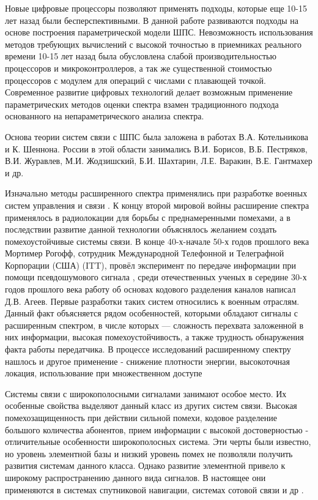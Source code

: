 Новые цифровые процессоры позволяют применять подходы, которые еще 10-15 лет назад были бесперспективными.
В данной работе развиваются подходы на основе построения параметрической модели ШПС. Невозможность использования
методов требующих вычислений с высокой точностью в приемниках реального времени
10-15 лет назад была обусловлена слабой производительностью процессоров и микроконтроллеров, а так же существенной
стоимостью процессоров с модулем для операций с числами с плавающей точкой. Современное развитие цифровых технологий делает 
возможным применение параметрических методов оценки спектра взамен традиционного подхода основанного на непараметрического
анализа спектра.

Основа теории систем связи с ШПС была заложена в работах В.А. Котельникова и К. Шеннона.
России в этой области занимались В.И. Борисов, В.Б. Пестряков, В.И. Журавлев, М.И. Жодзишский, Б.И. Шахтарин, Л.Е.  Варакин, В.Е. Гантмахер и др.

Изначально методы расширенного спектра применялись при разработке военных систем управления и связи \cite{sklyar}.
К концу второй мировой войны расширение спектра применялось в радиолокации для борьбы с преднамеренными помехами, а
в последствии развитие данной технологии объяснялось желанием создать помехоустойчивые системы связи.
В конце 40-х-начале 50-х годов прошлого века Мортимер Рогофф, сотрудник Международной Телефонной и Телеграфной Корпорации (США) (ITT),
провёл эксперимент по передаче информации при помощи псевдошумового сигнала \cite{sklyar}, среди отечественных ученых
в середине 30-х годов прошлого века работу об основах кодового разделения каналов написал Д.В. Агеев.
Первые разработки таких систем относились к военным отраслям. Данный факт объясняется рядом особенностей, которыми обладают
сигналы с расширенным спектром, в числе которых — сложность перехвата заложенной в них информации,
высокая помехоустойчивость, а также трудность обнаружения факта работы передатчика. В процессе исследований расширенному спектру
нашлось и другое применение - снижение плотности энергии, высокоточная локация, использование при множественном доступе
\cite{sklyar}

Системы связи с широкополосными сигналами занимают особое место. Их особенные свойства выделяют данный класс из других систем
связи. Высокая помехозащищенность при действии сильной помехи, кодовое разделение большого количества абонентов, прием
информации с высокой достоверностью - отличительные особенности широкополосных система. Эти черты были известно, но
уровень элементной базы и низкий уровень помех не позволяли получить развития системам данного класса. Однако развитие
элементной привело к широкому распространению данного вида сигналов. В настоящее они применяются в системах спутниковой навигации,
системах сотовой связи и др \cite{varakin-book}.

